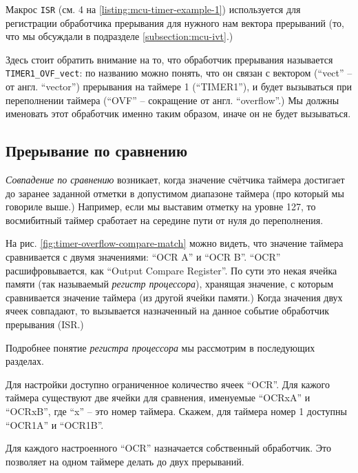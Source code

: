 \documentclass[../sparc.tex]{subfiles}
\begin{document}
Макрос \texttt{ISR} (см. 4 на \ref{listing:mcu-timer-example-1})
используется для регистрации обработчика прерывания для нужного нам вектора
прерываний (то, что мы обсуждали в подразделе \ref{subsection:mcu-ivt}.)

Здесь стоит обратить внимание на то, что обработчик прерывания называется
\texttt{TIMER1_OVF_vect}: по названию можно понять, что он связан с
вектором (``vect'' -- от англ. ``vector'') прерывания на таймере 1 (``TIMER1''),
и будет вызываться при переполнении таймера (``OVF'' -- сокращение от англ.
``overflow''.)  Мы должны именовать этот обработчик именно таким образом, иначе
он не будет вызываться.

\subsection{Прерывание по сравнению}


\emph{Совпадение по сравнению} возникает, когда значение счётчика таймера
достигает до заранее заданной отметки в допустимом диапазоне таймера (про
который мы говориле выше.)  Например, если мы выставим отметку на уровне 127, то
восмибитный таймер сработает на середине пути от нуля до переполнения.


На рис. \ref{fig:timer-overflow-compare-match} можно видеть, что значение
таймера сравнивается с двумя значениями: ``OCR A'' и ``OCR B''. ``OCR''
расшифровывается, как ``Output Compare Register''.  По сути это некая ячейка
памяти (так называемый \emph{регистр процессора}), хранящая значение, с которым
сравнивается значение таймера (из другой ячейки памяти.)  Когда значения двух
ячеек совпадают, то вызывается назначенный на данное событие обработчик
прерывания (\gls{ISR}.)

Подробнее понятие \emph{регистра процессора} мы рассмотрим в последующих
разделах.

Для настройки доступно ограниченное количество ячеек ``OCR''.  Для кажого
таймера существуют две ячейки для сравнения, именуемые ``OCRxA'' и ``OCRxB'',
где ``x'' -- это номер таймера.  Скажем, для таймера номер 1 доступны ``OCR1A'' и
``OCR1B''.

Для каждого настроенного ``OCR'' назначается собственный обработчик.  Это
позволяет на одном таймере делать до двух прерываний.
\end{document}

